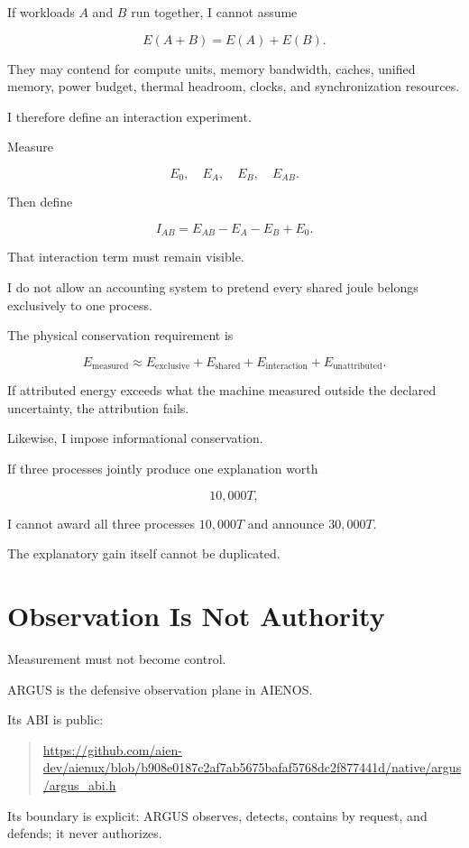 \documentclass[11pt]{article}
\begin{document}
If workloads \(A\) and \(B\) run together, I cannot assume

\[
E(A+B)=E(A)+E(B).
\]

They may contend for compute units, memory bandwidth, caches, unified memory, power budget, thermal headroom, clocks, and synchronization resources.

I therefore define an interaction experiment.

Measure

\[
E_0,\quad E_A,\quad E_B,\quad E_{AB}.
\]

Then define

\[
\boxed{
I_{AB}
=
E_{AB}-E_A-E_B+E_0.
}
\]

That interaction term must remain visible.

I do not allow an accounting system to pretend every shared joule belongs exclusively to one process.

The physical conservation requirement is

\[
E_{\text{measured}}
\approx
E_{\text{exclusive}}
+
E_{\text{shared}}
+
E_{\text{interaction}}
+
E_{\text{unattributed}}.
\]

If attributed energy exceeds what the machine measured outside the declared uncertainty, the attribution fails.

Likewise, I impose informational conservation.

If three processes jointly produce one explanation worth

\[
10{,}000T,
\]

I cannot award all three processes \(10{,}000T\) and announce \(30{,}000T\).

The explanatory gain itself cannot be duplicated.

\section{Observation Is Not Authority}

Measurement must not become control.

ARGUS is the defensive observation plane in AIENOS.

Its ABI is public:

\begin{quote}
\url{https://github.com/aien-dev/aienux/blob/b908e0187c2af7ab5675bafaf5768dc2f877441d/native/argus/argus_abi.h}
\end{quote}

Its boundary is explicit: ARGUS observes, detects, contains by request, and defends; it never authorizes.
\end{document}
